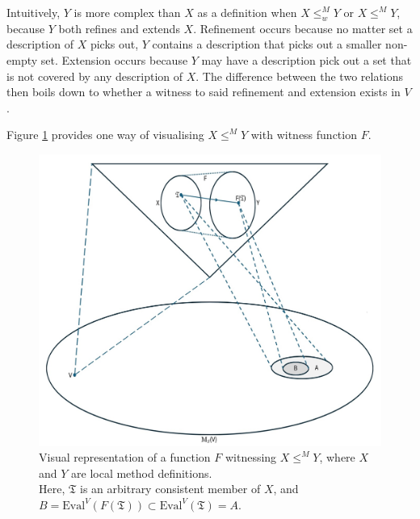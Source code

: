 \documentclass[12pt, twoside]{memoir}
\numberwithin{equation}{section}
\theoremstyle{definition}
\theoremstyle{remark}
\theoremstyle{definition}
\theoremstyle{definition}
\theoremstyle{definition}
\theoremstyle{remark}
\begin{document}
Intuitively, $Y$ is more complex than $X$ as a definition when $X \leq^M_w Y$ or $X \leq^M Y$, because $Y$ both refines and extends $X$. Refinement occurs because no matter set a description of $X$ picks out, $Y$ contains a description that picks out a smaller non-empty set. Extension occurs because $Y$ may have a description pick out a set that is not covered by any description of $X$. The difference between the two relations then boils down to whether a witness to said refinement and extension exists in $V$.

Figure \ref{intuition} provides one way of visualising $X \leq^M Y$ with witness function $F$.

\begin{figure}[!ht]
    \centering
    \centerline{\hspace{1pt}\includegraphics[width=1.05\textwidth]{intuition.jpg}}
    \captionsetup{width=0.8\textwidth, format=hang}
    \caption[Visual representation of a function $F$ witnessing $X \leq^M Y$]{Visual representation of a function $F$ witnessing $X \leq^M Y$, where $X$ and $Y$ are local method definitions. \\ Here, $\mathfrak{T}$ is an arbitrary consistent member of $X$, and \\ $B = \mathrm{Eval}^V(F(\mathfrak{T})) \subset \mathrm{Eval}^V(\mathfrak{T}) = A$.}
    \label{intuition}
\end{figure}
\end{document}
